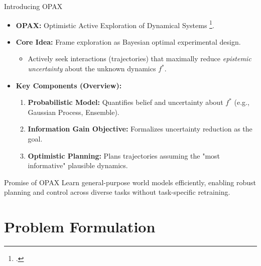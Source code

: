 \documentclass[11pt,aspectratio=169]{beamer}
\begin{document}
\begin{frame}{Introducing OPAX}
    \begin{itemize}
        \item \textbf{OPAX:} Optimistic Active Exploration of Dynamical Systems \footcite{sukhija2023optimistic}.
        \item \textbf{Core Idea:} Frame exploration as Bayesian optimal experimental design.
        \begin{itemize}
            \item Actively seek interactions (trajectories) that maximally reduce \textit{epistemic uncertainty} about the unknown dynamics $f^*$.
        \end{itemize}
        \pause
        \item \textbf{Key Components (Overview):}
        \begin{enumerate}
            \item \textbf{Probabilistic Model:} Quantifies belief and uncertainty about $f^*$ (e.g., Gaussian Process, Ensemble).
            \item \textbf{Information Gain Objective:} Formalizes uncertainty reduction as the goal.
            \item \textbf{Optimistic Planning:} Plans trajectories assuming the "most informative" plausible dynamics.
        \end{enumerate}
    \end{itemize}
    \vspace{1em}
    \begin{block}{Promise of OPAX}
        Learn general-purpose world models efficiently, enabling robust planning and control across diverse tasks without task-specific retraining.
    \end{block}
\end{frame}

\section{Problem Formulation}
\end{document}
